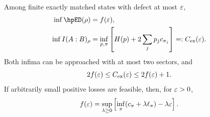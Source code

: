\begin{theorem}\label{hp:thm:sectors}
Among finite exactly matched states with defect at most $\varepsilon$,
\begin{align}
 \inf\hpED(\rho)&=f(\eps),\label{hp:eq:sectored}\\
 \inf I(A:B)_\rho&=\inf_{p,\pi}\left[H(p)+2\sum_jp_jc_{\pi_j}\right]=:C_{\rm ex}(\eps).
 \label{hp:eq:sectormi}
\end{align}
Both infima can be approached with at most two sectors, and
\begin{equation}
 2f(\varepsilon)\le C_{\rm ex}(\varepsilon)\le2f(\varepsilon)+1.\label{hp:eq:sectorbounds}
\end{equation}
If arbitrarily small positive losses are feasible, then, for $\varepsilon>0$,
\begin{equation}
 f(\varepsilon)=\sup_{\lambda\ge0}\left[
       \inf_\pi(c_\pi+\lambda\ell_\pi)-\lambda\varepsilon\right].\label{hp:eq:sectordual}
\end{equation}
\end{theorem}
